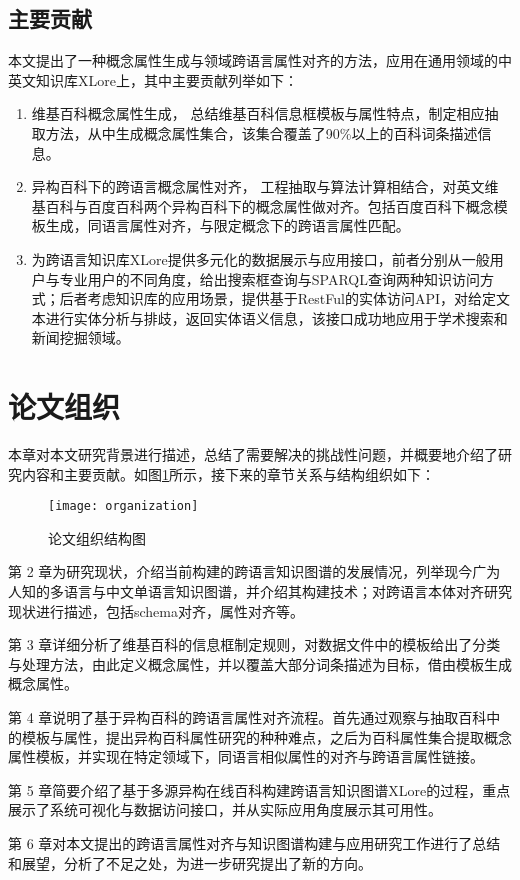 \subsection{主要贡献}
本文提出了一种概念属性生成与领域跨语言属性对齐的方法，应用在通用领域的中英文知识库XLore上，其中主要贡献列举如下：
\begin{enumerate}[1)]
\item {\heiti 维基百科概念属性生成，} 总结维基百科信息框模板与属性特点，制定相应抽取方法，从中生成概念属性集合，该集合覆盖了90\%以上的百科词条描述信息。
\item {\heiti 异构百科下的跨语言概念属性对齐，} 工程抽取与算法计算相结合，对英文维基百科与百度百科两个异构百科下的概念属性做对齐。包括百度百科下概念模板生成，同语言属性对齐，与限定概念下的跨语言属性匹配。
\item {\heiti 为跨语言知识库XLore提供多元化的数据展示与应用接口，}前者分别从一般用户与专业用户的不同角度，给出搜索框查询与SPARQL查询两种知识访问方式；后者考虑知识库的应用场景，提供基于RestFul的实体访问API，对给定文本进行实体分析与排歧，返回实体语义信息，该接口成功地应用于学术搜索和新闻挖掘领域。
\end{enumerate}

\section{论文组织}

本章对本文研究背景进行描述，总结了需要解决的挑战性问题，并概要地介绍了研究内容和主要贡献。如图\ref{fig:organization}所示，接下来的章节关系与结构组织如下：

\begin{figure}[ht] 
  \centering
  \texttt{[image: organization]}
  \caption{论文组织结构图}
  \label{fig:organization}
\end{figure}

第 2 章为研究现状，介绍当前构建的跨语言知识图谱的发展情况，列举现今广为人知的多语言与中文单语言知识图谱，并介绍其构建技术；对跨语言本体对齐研究现状进行描述，包括schema对齐，属性对齐等。

第 3 章详细分析了维基百科的信息框制定规则，对数据文件中的模板给出了分类与处理方法，由此定义概念属性，并以覆盖大部分词条描述为目标，借由模板生成概念属性。

第 4 章说明了基于异构百科的跨语言属性对齐流程。首先通过观察与抽取百科中的模板与属性，提出异构百科属性研究的种种难点，之后为百科属性集合提取概念属性模板，并实现在特定领域下，同语言相似属性的对齐与跨语言属性链接。

第 5 章简要介绍了基于多源异构在线百科构建跨语言知识图谱XLore的过程，重点展示了系统可视化与数据访问接口，并从实际应用角度展示其可用性。

第 6 章对本文提出的跨语言属性对齐与知识图谱构建与应用研究工作进行了总结和展望，分析了不足之处，为进一步研究提出了新的方向。

